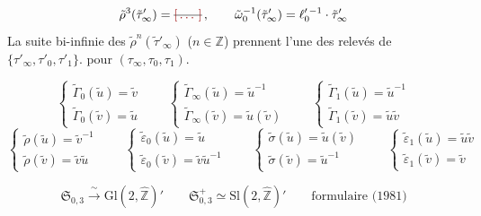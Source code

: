 \documentclass[11pt,a4paper]{article}
\begin{document}
\[
\tilde{\rho}^{3}(\tilde{\tau}'_\infty) = \text{\struck{\ill{}}}\,, \qquad \tilde{\omega}_0^{-1}(\tilde{\tau}'_\infty) = \ell_0'^{\,-1} \cdot \tilde{\tau}'_\infty
\]
La suite bi-infinie des \struck{\ill{}} $\tilde{\rho}^{n}(\tilde{\tau}'_\infty)$ ($n \in \mathbb{Z}$) prennent  l'une des relevés de $\{\tau'_\infty, \tau'_0, \tau'_1\}$.  pour $(\tau_\infty, \tau_0, \tau_1)$.

\[
\begin{cases} \tilde{\Gamma}_0(\tilde{u}) = \tilde{v} \\ \tilde{\Gamma}_0(\tilde{v}) = \tilde{u} \end{cases}
\qquad
\begin{cases} \tilde{\Gamma}_\infty(\tilde{u}) = \tilde{u}^{-1} \\ \tilde{\Gamma}_\infty(\tilde{v}) = \tilde{u}(\tilde{v}) \end{cases}
\qquad
\begin{cases} \tilde{\Gamma}_1(\tilde{u}) = \tilde{u}^{-1} \\ \tilde{\Gamma}_1(\tilde{v}) = \tilde{u}\tilde{v} \end{cases}
\]
\[
\begin{cases} \tilde{\rho}(\tilde{u}) = \tilde{v}^{-1} \\ \tilde{\rho}(\tilde{v}) = \tilde{v}\tilde{u} \end{cases}
\qquad
\begin{cases} \tilde{\varepsilon}_0(\tilde{u}) = \tilde{u} \\ \tilde{\varepsilon}_0(\tilde{v}) = \tilde{v}\tilde{u}^{-1} \end{cases}
\qquad
\begin{cases} \tilde{\sigma}(\tilde{u}) = \tilde{u}(\tilde{v}) \\ \tilde{\sigma}(\tilde{v}) = \tilde{u}^{-1} \end{cases}
\qquad
\begin{cases} \tilde{\varepsilon}_1(\tilde{u}) = \tilde{u}\tilde{v} \\ \tilde{\varepsilon}_1(\tilde{v}) = \tilde{v} \end{cases}
\]

\[
\boxed{\mathfrak{S}_{0,3} \xrightarrow{\ \sim\ } \mathrm{Gl}(2,\hat{\mathbb{Z}})'} \qquad
\boxed{\mathfrak{S}^{+}_{0,3} \simeq \mathrm{Sl}(2,\hat{\mathbb{Z}})'} \qquad \text{formulaire (1981)}
\]
\end{document}
